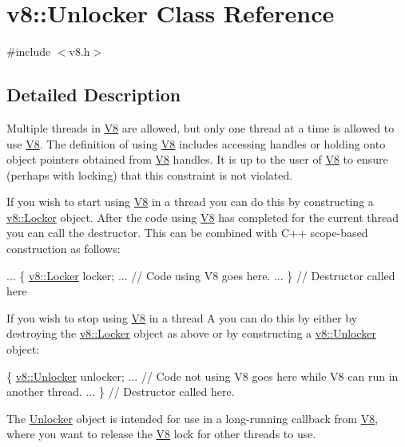 \hypertarget{classv8_1_1_unlocker}{}\section{v8\+:\+:Unlocker Class Reference}
\label{classv8_1_1_unlocker}


{\ttfamily \#include $<$v8.\+h$>$}



\subsection{Detailed Description}
Multiple threads in \hyperlink{classv8_1_1_v8}{V8} are allowed, but only one thread at a time is allowed to use \hyperlink{classv8_1_1_v8}{V8}. The definition of \textquotesingle{}using \hyperlink{classv8_1_1_v8}{V8}\textquotesingle{} includes accessing handles or holding onto object pointers obtained from \hyperlink{classv8_1_1_v8}{V8} handles. It is up to the user of \hyperlink{classv8_1_1_v8}{V8} to ensure (perhaps with locking) that this constraint is not violated.

If you wish to start using \hyperlink{classv8_1_1_v8}{V8} in a thread you can do this by constructing a \hyperlink{classv8_1_1_locker}{v8\+::\+Locker} object. After the code using \hyperlink{classv8_1_1_v8}{V8} has completed for the current thread you can call the destructor. This can be combined with C++ scope-\/based construction as follows\+:


\begin{DoxyCode}
...
\{
  \hyperlink{classv8_1_1_locker}{v8::Locker} locker;
  ...
  \textcolor{comment}{// Code using V8 goes here.}
  ...
\} \textcolor{comment}{// Destructor called here}
\end{DoxyCode}


If you wish to stop using \hyperlink{classv8_1_1_v8}{V8} in a thread A you can do this by either by destroying the \hyperlink{classv8_1_1_locker}{v8\+::\+Locker} object as above or by constructing a \hyperlink{classv8_1_1_unlocker}{v8\+::\+Unlocker} object\+:


\begin{DoxyCode}
\{
  \hyperlink{classv8_1_1_unlocker}{v8::Unlocker} unlocker;
  ...
  \textcolor{comment}{// Code not using V8 goes here while V8 can run in another thread.}
  ...
\} \textcolor{comment}{// Destructor called here.}
\end{DoxyCode}


The \hyperlink{classv8_1_1_unlocker}{Unlocker} object is intended for use in a long-\/running callback from \hyperlink{classv8_1_1_v8}{V8}, where you want to release the \hyperlink{classv8_1_1_v8}{V8} lock for other threads to use.

